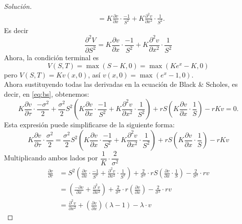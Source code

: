 \documentclass[11pt,notitlepage]{article}
\newenvironment{solucion}
  {\begin{proof}[Solución]}
  {\end{proof}}
\begin{document}
\begin{solucion}
\begin{align*}
        &= K \frac{\partial v}{\partial x} \cdot \frac{-1}{S^2} + K \frac{\partial^2 v}{\partial x^2} \cdot \frac{1}{S^2}.
    \end{align*}
    Es decir
    \begin{equation}
        \label{eq:ddVS}
        \frac{\partial ^2 V}{\partial S^2} = K \frac{\partial v}{\partial x} \cdot \frac{-1}{S^2} + K \frac{\partial^2 v}{\partial x^2} \cdot \frac{1}{S^2}
    \end{equation}
    Ahora, la condición terminal es
    $$ V(S,T) = \max (S-K, 0) = \max (Ke^x - K, 0) $$
    pero $V(S,T) = Kv(x, 0)$, así $v(x, 0) = \max(e^x - 1, 0)$.\\
    Ahora sustituyendo todas las derivadas en la ecuación de Black \& Scholes, es decir, en \eqref{eq:bs}, obtenemos:
    \begin{equation}
        \label{eq:bs1}
        K\frac{\partial v}{\partial \tau} \cdot \frac{-\sigma^2}{2} + \frac{\sigma^2}{2} S^2 \left(K\frac{\partial v}{\partial x} \cdot \frac{-1}{S^2} + K\frac{\partial^2 v}{\partial x^2} \cdot \frac{1}{S^2} \right) + rS \left(K\frac{\partial v}{\partial x} \cdot \frac{1}{S} \right) - rKv = 0.
    \end{equation}
    Esta expresión puede simplificarse de la siguiente forma:
    \begin{equation*}
        K\frac{\partial v}{\partial \tau} \cdot \frac{\sigma^2}{2} = \frac{\sigma^2}{2} S^2 \left(K\frac{\partial v}{\partial x} \cdot \frac{-1}{S^2} + K\frac{\partial^2 v}{\partial x^2} \cdot \frac{1}{S^2} \right) + rS \left(K\frac{\partial v}{\partial x} \cdot \frac{1}{S} \right) - rKv
    \end{equation*}
    Multiplicando ambos lados por $\dfrac{1}{K} \cdot \dfrac{2}{\sigma^2}$
    \begin{align*}
        \frac{\partial v}{\partial \tau} &= S^2 \left(\frac{\partial v}{\partial x} \cdot \frac{-1}{S^2} + \frac{\partial^2 v}{\partial x^2} \cdot \frac{1}{S^2} \right) + \frac{2}{\sigma^2} \cdot rS \left(\frac{\partial v}{\partial x} \cdot \frac{1}{S} \right) - \frac{2}{\sigma^2} \cdot rv\\
        &= \left(\frac{-\partial v}{\partial x} + \frac{\partial^2 v}{\partial x^2} \right) + \frac{2}{\sigma^2} \cdot r \left(\frac{\partial v}{\partial x}\right) - \frac{2}{\sigma^2} \cdot rv\\
        &= \frac{\partial^2 v}{\partial x^2} + \left(\frac{\partial v}{\partial x}\right) \left( \lambda - 1 \right) - \lambda \cdot v 
    \end{align*}

\end{solucion}
\end{document}
